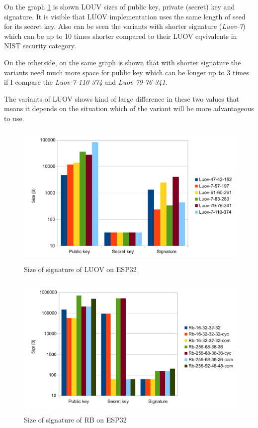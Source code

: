\documentclass[thesis=M,english]{FITthesis}[2019/12/23]
\begin{document}
\bigskip
\noindent
On the graph \ref{sign-luov} is shown LOUV sizes of public key, private (secret) key and signature. It is visible that LUOV implementation uses the same length of seed for its secret key. Also can be seen the variants with shorter signature (\textit{Luov-7}) which can be up to 10 times shorter compared to their LUOV eqvivalents in NIST security category.

\bigskip
\noindent
On the otherside, on the same graph is shown that with shorter signature the variants need much more space for public key which can be longer up to 3 times if I compare the \textit{Luov-7-110-374} and \textit{Luov-79-76-341}.

\bigskip
\noindent
The variants of LUOV shows kind of large difference in these two values that means it depends on the situation which of the variant will be more advantageous to use.  

\begin{figure}[H]
\centering
\includegraphics[width=13cm,height=7cm]{images/sign-luov.pdf}
\caption{Size of signature of LUOV on ESP32}
\label{sign-luov}
\end{figure}

\begin{figure}[H]
\centering
\includegraphics[width=13cm,height=7cm]{images/sign-rb.pdf}
\caption{Size of signature of RB on ESP32}
\label{sign-rb}
\end{figure}
\end{document}
